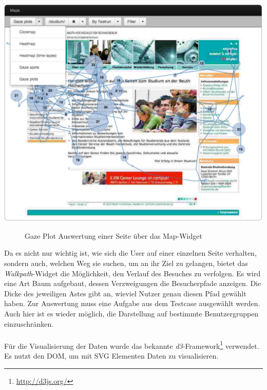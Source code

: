 \begin{center}
\includegraphics[scale=0.45]{./images/mapWidget}
\end{center}
\begin{figure}[htb]
   \centering
   \caption{Gaze Plot Auswertung einer Seite über das Map-Widget}
    \label{mapWidget}
\end{figure}

Da es nicht nur wichtig ist, wie sich die User auf einer einzelnen Seite verhalten, sondern auch, welchen Weg sie suchen, um an ihr Ziel zu gelangen, bietet das \textit{Walkpath}-Widget die Möglichkeit, den Verlauf des Besuches zu verfolgen. Es wird eine Art Baum aufgebaut, dessen Verzweigungen die Besucherpfade anzeigen. Die Dicke des jeweiligen Astes gibt an, wieviel Nutzer genau diesen Pfad gewählt haben. Zur Auswertung muss eine Aufgabe aus dem Testcase ausgewählt werden. Auch hier ist es wieder möglich, die Darstellung auf bestimmte Benutzergruppen einzuschränken.\\
\\
Für die Visualisierung der Daten wurde das bekannte \textit{d3}-Framework\footnote{\url{http://d3js.org/}} verwendet. Es nutzt den DOM, um mit SVG Elementen Daten zu visualisieren.

